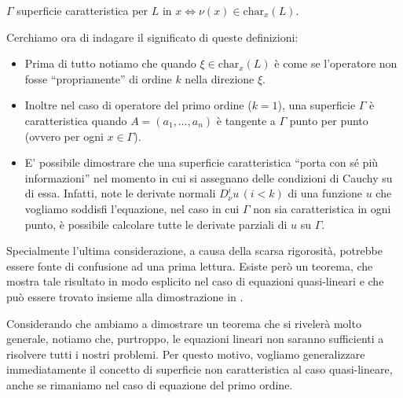 \begin{definition} \label{supcarlin}
$\Gamma$ superficie caratteristica per $L$ in $x \iff \nu(x) \in\text{char}_x (L)$.
\end{definition}

Cerchiamo ora di indagare il significato di queste definizioni:
\begin{itemize}
\item Prima di tutto notiamo che quando $\xi \in \text{char}_x (L)$ è come se l'operatore non fosse ``propriamente'' di ordine $k$ nella direzione $\xi$.
\item Inoltre nel caso di operatore del primo ordine ($k=1$), una superficie $\Gamma$ è caratteristica quando $A=(a_1,\ldots ,a_n)$ è tangente a $\Gamma$ punto per punto (ovvero per ogni $x\in \Gamma$).
\item E' possibile dimostrare che una superficie caratteristica ``porta con sé più informazioni'' nel momento in cui si assegnano delle condizioni di Cauchy su di essa. Infatti, note le derivate normali $D^i_\nu u \,(i<k)$ di una funzione $u$ che vogliamo soddisfi l'equazione, nel caso in cui $\Gamma$ non sia caratteristica in ogni punto, è possibile calcolare tutte le derivate parziali di $u$ su $\Gamma$.
\end{itemize}
\newpage
Specialmente l'ultima considerazione, a causa della scarsa rigorosità, potrebbe essere fonte di confusione ad una prima lettura. Esiste però un teorema, che mostra tale risultato in modo esplicito nel caso di equazioni quasi-lineari e che può essere trovato insieme alla dimostrazione in \cite[cap.4.6]{Evans}.

Considerando che ambiamo a dimostrare un teorema che si rivelerà molto generale, notiamo che, purtroppo, le equazioni lineari non saranno sufficienti a risolvere tutti i nostri problemi. Per questo motivo, vogliamo generalizzare immediatamente il concetto di superficie non caratteristica al caso quasi-lineare, anche se rimaniamo nel caso di equazione del primo ordine. 

